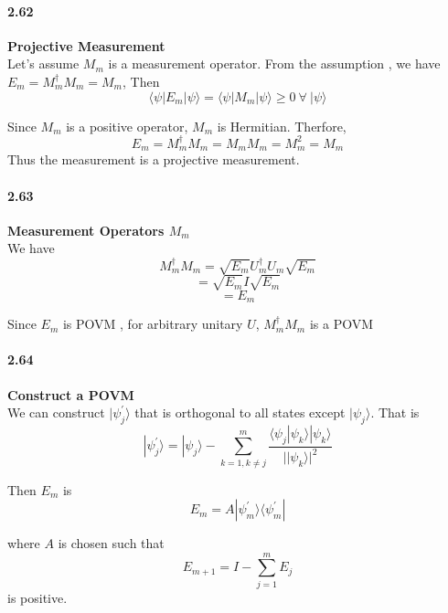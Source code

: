 
\paragraph{2.62} \textbf{Projective Measurement} \\%

Let's assume $M_m$ is a measurement operator. From the assumption , we have $E_m = M_m^{\dagger} M_m = M_m$, Then
$$ \langle \psi | E_m |\psi \rangle = \langle \psi |M_m|\psi\rangle \ge 0 \ \forall \ |\psi\rangle $$

Since $M_m $ is a positive operator, $M_m $ is Hermitian. Therfore,
$$ E_m = M_m^{\dagger} M_m = M_m M_m = M_m^2 = M_m$$
Thus the measurement is a projective measurement.




\paragraph{2.63} \textbf{Measurement Operators $M_m$} \\%

We have 
$$ M_m^{\dagger} M_m = \sqrt{E_m} U_m^{\dagger} U_m \sqrt{E_m}$$
$$ = \sqrt{E_m} I \sqrt{E_m}$$
$$ = E_m$$

Since $E_m $ is POVM , for arbitrary unitary $U$, $M_m^{\dagger} M_m$ is a POVM



\paragraph{2.64} \textbf{Construct a POVM} \\%

We can construct $|\psi_j^{'}\rangle$ that is orthogonal to all states except $|\psi_j\rangle$. That is
$$ |\psi_j^{'}\rangle = |\psi_j\rangle - \sum_{k = 1, k \ne j}^{m} \frac{\langle \psi_j| \psi_k\rangle |\psi_k\rangle }{|| \psi_k \rangle|^2}$$

Then $E_m$ is 
$$ E_m = A|\psi_m^{'} \rangle \langle \psi_m^{'}|$$

where $A$ is chosen such that
$$ E_{m+1} = I - \sum_{j=1}^{m} E_j$$
is positive.




